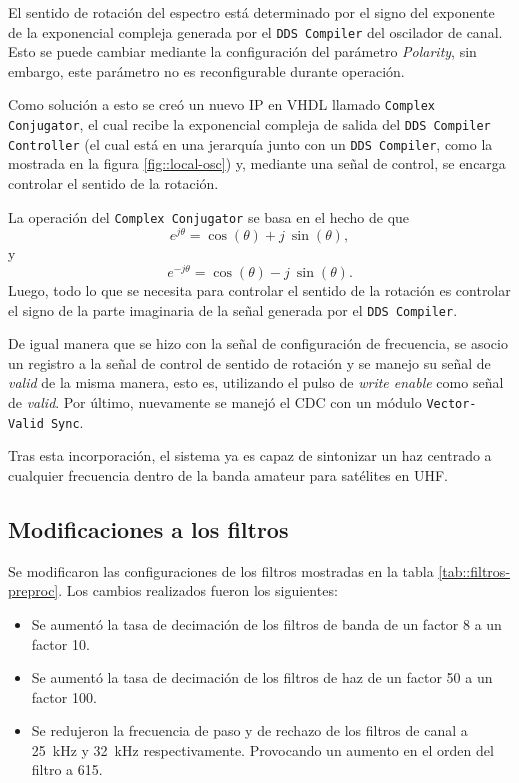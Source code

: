 \documentclass[../../main.tex]{subfiles}
\begin{document}
El sentido de rotación del espectro está determinado por el signo del exponente de la exponencial compleja generada por el \texttt{DDS Compiler} del oscilador de canal. Esto se puede cambiar mediante la configuración del parámetro \textit{Polarity}, sin embargo, este parámetro no es reconfigurable durante operación. 

Como solución a esto se creó un nuevo IP en VHDL llamado \texttt{Complex Conjugator}, el cual recibe la exponencial compleja de salida del \texttt{DDS Compiler Controller} (el cual está en una jerarquía junto con un \texttt{DDS Compiler}, como la mostrada en la figura \ref{fig::local-osc}) y, mediante una señal de control, se encarga controlar el sentido de la rotación. 

La operación del \texttt{Complex Conjugator} se basa en el hecho de que
\[e^{j\theta} = \cos(\theta) + j \ \sin(\theta),\] y \[e^{-j\theta} = \cos(\theta) - j \ \sin(\theta).\] Luego, todo lo que se necesita para controlar el sentido de la rotación es controlar el signo de la parte imaginaria de la señal generada por el \texttt{DDS Compiler}.

De igual manera que se hizo con la señal de configuración de frecuencia, se asocio un registro a la señal de control de sentido de rotación y se manejo su señal de \textit{valid} de la misma manera, esto es, utilizando el pulso de \textit{write enable} como señal de \textit{valid}. Por último, nuevamente se manejó el CDC con un módulo \texttt{Vector-Valid Sync}.

Tras esta incorporación, el sistema ya es capaz de sintonizar un haz centrado a cualquier frecuencia dentro de la banda amateur para satélites en UHF.


\subsection{Modificaciones a los filtros}
Se modificaron las configuraciones de los filtros mostradas en la tabla \ref{tab::filtros-preproc}. Los cambios realizados fueron los siguientes:
\begin{itemize}
    \item Se aumentó la tasa de decimación de los filtros de banda de un factor 8 a un factor 10.
    \item Se aumentó la tasa de decimación de los filtros de haz de un factor 50 a un factor 100.
    \item Se redujeron la frecuencia de paso y de rechazo de los filtros de canal a 25~kHz y 32~kHz respectivamente. Provocando un aumento en el orden del filtro a 615.
\end{itemize}
\end{document}
